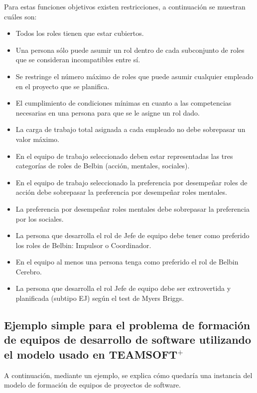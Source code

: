 Para estas funciones objetivos existen restricciones, a continuación se muestran cuáles son:
\begin{itemize}
	\item Todos los roles tienen que estar cubiertos.
	\item Una persona sólo puede asumir un rol dentro de cada subconjunto de roles que se consideran incompatibles entre sí.
	\item Se restringe el número máximo de roles que puede asumir cualquier empleado en el proyecto que se planifica.
	\item El cumplimiento de condiciones mínimas en cuanto a las competencias necesarias
	en una persona para que se le asigne un rol dado.
	\item La carga de trabajo total asignada a cada empleado no debe sobrepasar un valor
	máximo.
	\item En el equipo de trabajo seleccionado deben estar representadas las tres
	categorías de roles de Belbin (acción, mentales, sociales).
	\item En el equipo de trabajo seleccionado la preferencia por desempeñar roles de acción debe sobrepasar la preferencia por desempeñar roles mentales.
	\item La preferencia por desempeñar roles mentales debe	sobrepasar la preferencia por los sociales.
	\item La persona que desarrolla el rol de Jefe de equipo debe tener como preferido los roles de Belbin: Impulsor o Coordinador.
	\item En el equipo al menos una persona tenga como preferido el rol de Belbin Cerebro.
	\item La persona que desarrolla el rol Jefe de equipo debe ser extrovertida y planificada (subtipo EJ) según el test de Myers Briggs.
\end{itemize}

\subsection{Ejemplo simple para el problema de formación de equipos de desarrollo de software utilizando el modelo usado en TEAMSOFT$^+$} \label{ej-sof}

A continuación, mediante un ejemplo, se explica cómo quedaría una instancia del modelo de formación de equipos de proyectos de software.


